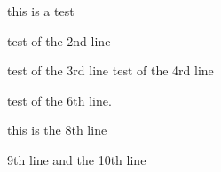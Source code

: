 this is a test

test of the 2nd line

test of the 3rd line
test of the 4rd line

test of the 6th line.


this is the 8th line

9th line
and the 10th line

